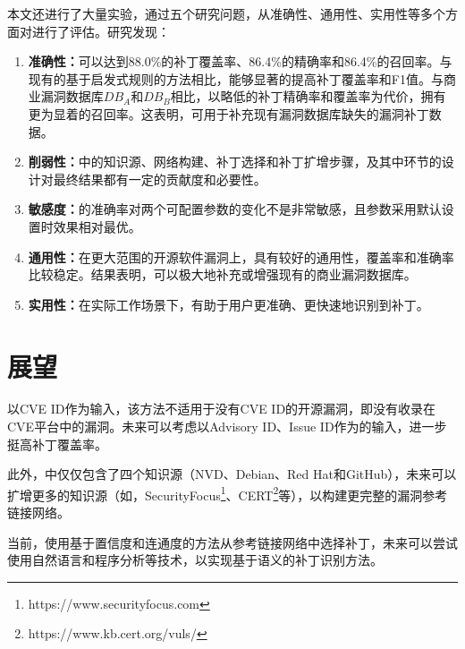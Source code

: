 本文还进行了大量实验，通过五个研究问题，从准确性、通用性、实用性等多个方面对\tool 进行了评估。研究发现：
\begin{enumerate}
    \item [（1）] \textbf{准确性：}\tool 可以达到88.0\%的补丁覆盖率、86.4\%的精确率和86.4\%的召回率。与现有的基于启发式规则的方法相比，\tool 能够显著的提高补丁覆盖率和F1值。与商业漏洞数据库$DB_A$和$DB_B$相比，\tool 以略低的补丁精确率和覆盖率为代价，拥有更为显着的召回率。这表明，\tool 可用于补充现有漏洞数据库缺失的漏洞补丁数据。
    \item [（2）] \textbf{削弱性：}\tool 中的知识源、网络构建、补丁选择和补丁扩增步骤，及其中环节的设计对最终结果都有一定的贡献度和必要性。
    \item [（3）] \textbf{敏感度：}\tool 的准确率对两个可配置参数的变化不是非常敏感，且\tool 参数采用默认设置时效果相对最优。
    \item [（4）] \textbf{通用性：}在更大范围的开源软件漏洞上，\tool 具有较好的通用性，覆盖率和准确率比较稳定。结果表明，\tool 可以极大地补充或增强现有的商业漏洞数据库。
    \item [（5）] \textbf{实用性：}在实际工作场景下，\tool 有助于用户更准确、更快速地识别到补丁。
\end{enumerate}


\section{展望}

\tool 以CVE ID作为输入，该方法不适用于没有CVE ID的开源漏洞，即没有收录在CVE平台中的漏洞。未来可以考虑以Advisory ID、Issue ID作为\tool 的输入，进一步挺高补丁覆盖率。

此外，\tool 中仅仅包含了四个知识源（NVD、Debian、Red Hat和GitHub），未来可以扩增更多的知识源（如，SecurityFocus\footnote{https://www.securityfocus.com}、CERT\footnote{https://www.kb.cert.org/vuls/}等），以构建更完整的漏洞参考链接网络。

当前，\tool 使用基于置信度和连通度的方法从参考链接网络中选择补丁，未来可以尝试使用自然语言和程序分析等技术，以实现基于语义的补丁识别方法。